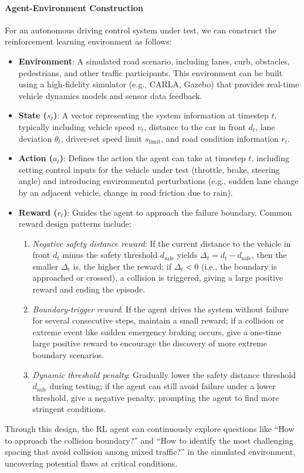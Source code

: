\documentclass[manuscript,screen,review]{acmart}
\begin{document}
\paragraph{Agent-Environment Construction}  
For an autonomous driving control system under test, we can construct the reinforcement learning environment as follows:
\begin{itemize}
  \item \textbf{Environment}: A simulated road scenario, including lanes, curb, obstacles, pedestrians, and other traffic participants. This environment can be built using a high-fidelity simulator (e.g., CARLA, Gazebo) that provides real-time vehicle dynamics models and sensor data feedback.
  \item \textbf{State ($s_t$)}: A vector representing the system information at timestep $t$, typically including vehicle speed $v_t$, distance to the car in front $d_t$, lane deviation $\theta_t$, driver-set speed limit $s_{\mathrm{limit}}$, and road condition information $r_t$.
  \item \textbf{Action ($a_t$)}: Defines the action the agent can take at timestep $t$, including setting control inputs for the vehicle under test (throttle, brake, steering angle) and introducing environmental perturbations (e.g., sudden lane change by an adjacent vehicle, change in road friction due to rain).
  \item \textbf{Reward ($r_t$)}: Guides the agent to approach the failure boundary. Common reward design patterns include:
    \begin{enumerate}
      \item \emph{Negative safety distance reward}: If the current distance to the vehicle in front $d_t$ minus the safety threshold $d_{\mathrm{safe}}$ yields $\Delta_t = d_t - d_{\mathrm{safe}}$, then the smaller $\Delta_t$ is, the higher the reward; if $\Delta_t < 0$ (i.e., the boundary is approached or crossed), a collision is triggered, giving a large positive reward and ending the episode.
      \item \emph{Boundary-trigger reward}: If the agent drives the system without failure for several consecutive steps, maintain a small reward; if a collision or extreme event like sudden emergency braking occurs, give a one-time large positive reward to encourage the discovery of more extreme boundary scenarios.
      \item \emph{Dynamic threshold penalty}: Gradually lower the safety distance threshold $d_{\mathrm{safe}}$ during testing; if the agent can still avoid failure under a lower threshold, give a negative penalty, prompting the agent to find more stringent conditions.
    \end{enumerate}
\end{itemize}
Through this design, the RL agent can continuously explore questions like ``How to approach the collision boundary?'' and ``How to identify the most challenging spacing that avoid collision among mixed traffic?'' in the simulated environment, uncovering potential flaws at critical conditions.
\end{document}
